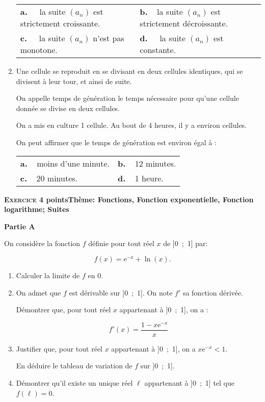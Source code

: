 \documentclass[10pt,a4paper]{article}
\begin{document}
\begin{enumerate}
\begin{center}
\begin{tabularx}{\linewidth}{*{2}{X}}
\textbf{a.~~} la suite $\left(a_n\right)$ est strictement croissante.&\textbf{b.~~}la suite $\left(a_n\right)$ est strictement décroissante.\\
\textbf{c.~~} la suite $\left(a_n\right)$ n'est pas monotone.&\textbf{d.~~} la suite $\left(a_n\right)$ est constante.
\end{tabularx}
\end{center}
\item Une cellule se reproduit en se divisant en deux cellules identiques, qui se divisent à leur tour, et ainsi de suite. 

On appelle temps de génération le temps nécessaire pour qu'une cellule donnée se divise en deux cellules.

On a mis en culture 1 cellule. Au bout de 4 heures, il y a environ  cellules.

On peut affirmer que le temps de génération est environ égal à :

\begin{center}
\begin{tabularx}{\linewidth}{*{2}{X}}
\textbf{a.~~}moins d'une minute.&\textbf{b.~~}12 minutes.\\
\textbf{c.~~}20 minutes.		&\textbf{d.~~}1 heure.
\end{tabularx}
\end{center}

\end{enumerate}

\bigskip

\textbf{\textsc{Exercice 4}  points\hfill Thème: Fonctions, Fonction exponentielle, Fonction logarithme; Suites}

\medskip

\textbf{Partie A}

\medskip

On considère la fonction $f$ définie pour tout réel $x$ de ]0~;~1] par:

\[f(x) = \text{e}^{-x} + \ln (x).\]

\smallskip

\begin{enumerate}
\item Calculer la limite de $f$ en $0$.
\item On admet que $f$ est dérivable sur ]0~;~1]. On note $f'$ sa fonction dérivée.

Démontrer que, pour tout réel $x$ appartenant à ]0~;~1], on a :

\[f'(x) = \dfrac{1 - x\text{e}^{-x}}{x}\]

\item Justifier que, pour tout réel $x$ appartenant à ]0~;~1], on a $x\text{e}^{-x} < 1$.

En déduire le tableau de variation de $f$ sur ]0~;~1].
\item Démontrer qu'il existe un unique réel $\ell$ appartenant à ]0~;~1] tel que $f(\ell) = 0$.
\end{enumerate}
\end{document}
